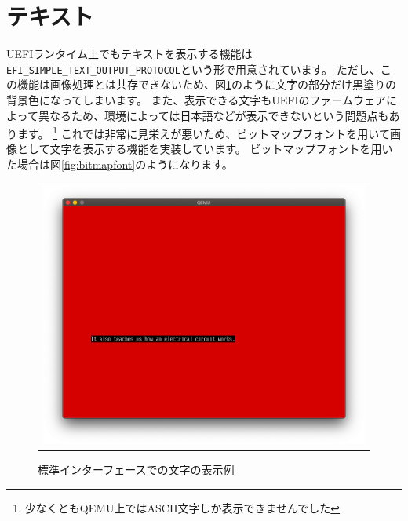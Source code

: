 \documentclass[10pt,b5paper,twoside,openany]{ltjsbook}
\begin{document}
\section{テキスト}
UEFIランタイム上でもテキストを表示する機能は\verb+EFI_SIMPLE_TEXT_OUTPUT_PROTOCOL+という形で用意されています。
ただし、この機能は画像処理とは共存できないため、図\ref{fig:defaultfont}のように文字の部分だけ黒塗りの背景色になってしまいます。
また、表示できる文字もUEFIのファームウェアによって異なるため、環境によっては日本語などが表示できないという問題点もあります。
\footnote{少なくともQEMU上ではASCII文字しか表示できませんでした}
これでは非常に見栄えが悪いため、ビットマップフォントを用いて画像として文字を表示する機能を実装しています。
ビットマップフォントを用いた場合は図\ref{fig:bitmapfont}のようになります。
\begin{figure}[H]
    \centering
    \begin{tabular}{c}
        \begin{minipage}{0.5\hsize}
            \centering
            \includegraphics[scale=0.22]{pic/defaultfont.png}
            \caption{標準インターフェースでの文字の表示例}
            \label{fig:defaultfont}
        \end{minipage}
        \begin{minipage}{0.5\hsize}
            \centering

\end{minipage}
\end{tabular}
\end{figure}
\end{document}

